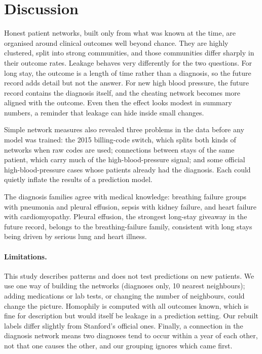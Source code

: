 \section{Discussion}
\label{sec:discussion}

Honest patient networks, built only from what was known at the time, are organised around clinical outcomes well beyond chance. They are highly clustered, split into strong communities, and those communities differ sharply in their outcome rates. Leakage behaves very differently for the two questions. For long stay, the outcome is a length of time rather than a diagnosis, so the future record adds detail but not the answer. For new high blood pressure, the future record contains the diagnosis itself, and the cheating network becomes more aligned with the outcome. Even then the effect looks modest in summary numbers, a reminder that leakage can hide inside small changes.

Simple network measures also revealed three problems in the data before any model was trained: the 2015 billing-code switch, which splits both kinds of networks when raw codes are used; connections between stays of the same patient, which carry much of the high-blood-pressure signal; and some official high-blood-pressure cases whose patients already had the diagnosis. Each could quietly inflate the results of a prediction model.

The diagnosis families agree with medical knowledge: breathing failure groups with pneumonia and pleural effusion, sepsis with kidney failure, and heart failure with cardiomyopathy. Pleural effusion, the strongest long-stay giveaway in the future record, belongs to the breathing-failure family, consistent with long stays being driven by serious lung and heart illness.

\paragraph{Limitations.} This study describes patterns and does not test predictions on new patients. We use one way of building the networks (diagnoses only, 10 nearest neighbours); adding medications or lab tests, or changing the number of neighbours, could change the picture. Homophily is computed with all outcomes known, which is fine for description but would itself be leakage in a prediction setting. Our rebuilt labels differ slightly from Stanford's official ones. Finally, a connection in the diagnosis network means two diagnoses tend to occur within a year of each other, not that one causes the other, and our grouping ignores which came first.

